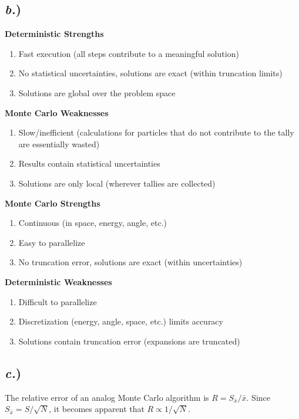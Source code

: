\documentclass{article}
\begin{document}
\subsection*{\textit{b.})}
\begin{multicols}{2}
\textbf{Deterministic Strengths} \\
\begin{enumerate}
\item Fast execution (all steps contribute to a meaningful solution)
\item No statistical uncertainties, solutions are exact (within truncation limits)
\item Solutions are global over the problem space
\end{enumerate}

\textbf{Monte Carlo Weaknesses} \\
\begin{enumerate}
\item Slow/inefficient (calculations for particles that do not contribute to the tally are essentially wasted)
\item Results contain statistical uncertainties
\item Solutions are only local (wherever tallies are collected)
\end{enumerate}

\columnbreak

\textbf{Monte Carlo Strengths} \\
\begin{enumerate}
\item Continuous (in space, energy, angle, etc.)
\item Easy to parallelize
\item No truncation error, solutions are exact (within uncertainties)
\end{enumerate}

\textbf{Deterministic Weaknesses} \\
\begin{enumerate}
\item Difficult to parallelize
\item Discretization (energy, angle, space, etc.) limits accuracy
\item Solutions contain truncation error (expansions are truncated)
\end{enumerate}

\end{multicols}

\subsection*{\textit{c.})}
The relative error of an analog Monte Carlo algorithm is $R = S_{\bar{x}}/{\bar{x}}$. Since $S_{\bar{x}} = S/\sqrt{N}$, it becomes apparent that $R \propto 1/\sqrt{N}$.
\end{document}
